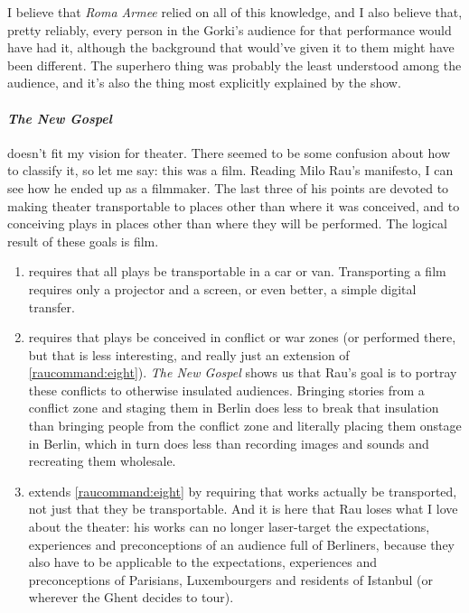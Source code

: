 I believe that \textit{Roma Armee} relied on all of this knowledge, and I also believe
that, pretty reliably, every person in the Gorki's audience for that performance would
have had it, although the background that would've given it to them might have been
different. The superhero thing was probably the least understood among the audience, and
it's also the thing most explicitly explained by the show.

\clearpage{}

\paragraph{\textit{The New Gospel}} doesn't fit my vision for theater. There seemed to be
some confusion about how to classify it, so let me say: this was a film. Reading Milo
Rau's manifesto, I can see how he ended up as a filmmaker. The last three of his points
are devoted to making theater transportable to places other than where it was conceived,
and to conceiving plays in places other than where they will be performed. The logical
result of these goals is film.

\begin{enumerate}[label={Command \arabic{*}}, start=8]
\item \label{raucommand:eight} requires that all plays be transportable in a car or
  van. Transporting a film requires only a projector and a screen, or even better, a
  simple digital transfer.

\item requires that plays be conceived in conflict or war zones (or performed there, but
  that is less interesting, and really just an extension of
  \ref{raucommand:eight}). \textit{The New Gospel} shows us that Rau's goal is to portray
  these conflicts to otherwise insulated audiences. Bringing stories from a conflict zone
  and staging them in Berlin does less to break that insulation than bringing people from
  the conflict zone and literally placing them onstage in Berlin, which in turn does less
  than recording images and sounds and recreating them wholesale.

\item extends \ref{raucommand:eight} by requiring that works actually be transported, not
  just that they be transportable. And it is here that Rau loses what I love about the
  theater: his works can no longer laser-target the expectations, experiences and
  preconceptions of an audience full of Berliners, because they also have to be applicable
  to the expectations, experiences and preconceptions of Parisians, Luxembourgers and
  residents of Istanbul (or wherever the Ghent decides to tour).
\end{enumerate}

